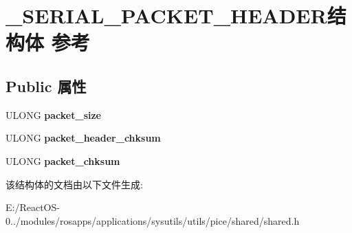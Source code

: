 \hypertarget{struct___s_e_r_i_a_l___p_a_c_k_e_t___h_e_a_d_e_r}{}\section{\+\_\+\+S\+E\+R\+I\+A\+L\+\_\+\+P\+A\+C\+K\+E\+T\+\_\+\+H\+E\+A\+D\+E\+R结构体 参考}
\label{struct___s_e_r_i_a_l___p_a_c_k_e_t___h_e_a_d_e_r}
\subsection*{Public 属性}
\begin{DoxyCompactItemize}
\item 
\mbox{\label{struct___s_e_r_i_a_l___p_a_c_k_e_t___h_e_a_d_e_r_afdc114e187e56b4b93c09438213b4f13}} 
U\+L\+O\+NG {\bfseries packet\+\_\+size}
\item 
\mbox{\label{struct___s_e_r_i_a_l___p_a_c_k_e_t___h_e_a_d_e_r_a850a4890a60a23d74f64611144cc8525}} 
U\+L\+O\+NG {\bfseries packet\+\_\+header\+\_\+chksum}
\item 
\mbox{\label{struct___s_e_r_i_a_l___p_a_c_k_e_t___h_e_a_d_e_r_a17e21219872090c8c8be606db642d852}} 
U\+L\+O\+NG {\bfseries packet\+\_\+chksum}
\end{DoxyCompactItemize}


该结构体的文档由以下文件生成\+:\begin{DoxyCompactItemize}
\item 
E\+:/\+React\+O\+S-\/0../modules/rosapps/applications/sysutils/utils/pice/shared/shared.\+h\end{DoxyCompactItemize}
